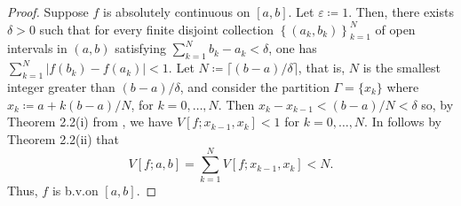 \begin{proof}
Suppose $f$ is absolutely continuous on $[a,b]$. Let $\varepsilon\coloneq
1$. Then, there exists $\delta>0$ such that for every finite disjoint
collection $\left\{(a_k,b_k)\right\}_{k=1}^N$ of open intervals in $(a,b)$
satisfying $\sum_{k=1}^Nb_k-a_k<\delta$, one has
$\sum_{k=1}^N\left|f(b_k)-f(a_k)\right|<1$. Let
$N\coloneq\lceil(b-a)/\delta\rceil$, that is, $N$ is the smallest integer
greater than $(b-a)/\delta$, and consider the partition $\Gamma=\{x_k\}$
where $x_k\coloneq a+k(b-a)/N$, for $k=0,\dotsc,N$. Then
$x_k-x_{k-1}<(b-a)/N<\delta$ so, by Theorem 2.2(i) from \cite[Ch.\@ 2, p.\@
19]{wheeden-zygmund}, we have $V[f;x_{k-1},x_k]<1$ for $k=0,\dotsc,N$. In
follows by Theorem 2.2(ii) that
\begin{equation}
\label{eq:prep:1:14}
V[f;a,b]=\sum_{k=1}^N V[f;x_{k-1},x_k]<N.
\end{equation}
Thus, $f$ is b.v.\@ on $[a,b]$.
\end{proof}

